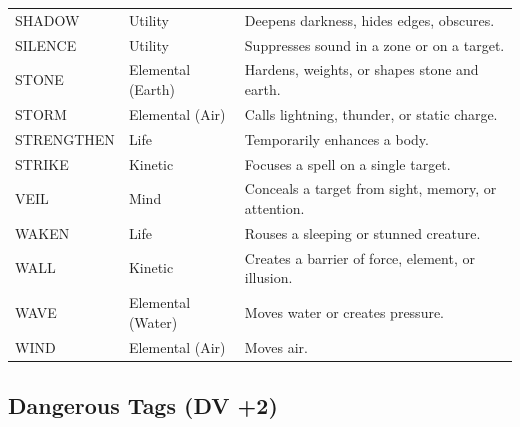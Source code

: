\begin{longtable}{p{} p{} p{}}
SHADOW & Utility & Deepens darkness, hides edges, obscures. \\
SILENCE & Utility & Suppresses sound in a zone or on a target. \\
STONE & Elemental (Earth) & Hardens, weights, or shapes stone and earth. \\
STORM & Elemental (Air) & Calls lightning, thunder, or static charge. \\
STRENGTHEN & Life & Temporarily enhances a body. \\
STRIKE & Kinetic & Focuses a spell on a single target. \\
VEIL & Mind & Conceals a target from sight, memory, or attention. \\
WAKEN & Life & Rouses a sleeping or stunned creature. \\
WALL & Kinetic & Creates a barrier of force, element, or illusion. \\
WAVE & Elemental (Water) & Moves water or creates pressure. \\
WIND & Elemental (Air) & Moves air. \\
\hline
\end{longtable}

\subsection{Dangerous Tags (DV +2)}

